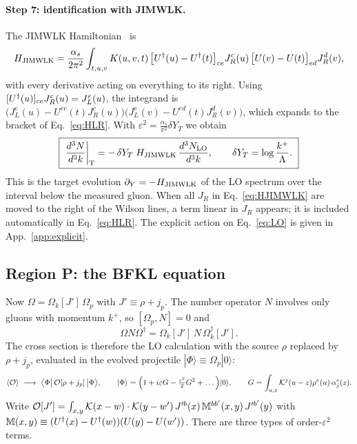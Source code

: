 \paragraph*{Step 7: identification with JIMWLK.} The JIMWLK Hamiltonian~\cite{JalilianMarian:1997jx,JalilianMarian:1997gr,JalilianMarian:1998cb,Kovner:2000pt,Weigert:2000gi,Iancu:2000hn,Ferreiro:2001qy} is
\begin{equation}
H_{\rm JIMWLK}=\frac{\alpha_s}{2\pi^2}\int_{t,u,v}K(u,v,t)\,\big[U^{\dagger}(u)-U^{\dagger}(t)\big]_{ce}J_R^c(u)\,\big[U(v)-U(t)\big]_{ed}J_R^d(v),
\label{eq:HJIMWLK}
\end{equation}
with every derivative acting on everything to its right. Using $[U^{\dagger}(u)]_{ce}J_R^c(u)=J_L^e(u)$, the integrand is $\big(J_L^e(u)-U^{ec}(t)J_R^c(u)\big)\big(J_L^e(v)-U^{ed}(t)J_R^d(v)\big)$, which expands to the bracket of Eq.~\eqref{eq:HLR}. With $\varepsilon^2=\frac{\alpha_s}{\pi^2}\delta Y_T$ we obtain
\begin{equation}
\boxed{\ \frac{d^3N}{d^3k}\bigg|_{\rm T}=-\,\delta Y_T\;H_{\rm JIMWLK}\,\frac{d^3N_{\rm LO}}{d^3k},\qquad \delta Y_T=\log\frac{k^+}{\Lambda}.\ }
\label{eq:Tresult}
\end{equation}
This is the target evolution $\partial_Y=-H_{\rm JIMWLK}$ of the LO spectrum over the interval below the measured gluon. When all $J_R$ in Eq.~\eqref{eq:HJIMWLK} are moved to the right of the Wilson lines, a term linear in $J_R$ appears; it is included automatically in Eq.~\eqref{eq:HLR}. The explicit action on Eq.~\eqref{eq:LO} is given in App.~\ref{app:explicit}.

\subsection{Region P: the BFKL equation}\label{sec:P}

Now $\Omega=\Omega_k[J']\,\Omega_p$ with $J'\equiv\rho+j_p$. The number operator $N$ involves only gluons with momentum $k^+$, so $[\Omega_p,N]=0$ and
\begin{equation}
\Omega N\Omega^\dagger=\Omega_k[J']\,N\,\Omega_k^\dagger[J'].
\end{equation}
The cross section is therefore the LO calculation with the source $\rho$ replaced by $\rho+j_p$, evaluated in the evolved projectile $|\Phi\rangle\equiv\Omega_p|0\rangle$:
\begin{equation}
\langle\Ord\rangle\ \longrightarrow\ \big\langle\Phi\big|\,\Ord[\rho+j_p]\,\big|\Phi\big\rangle,\qquad|\Phi\rangle=\Big(1+i\varepsilon G-\tfrac{\varepsilon^2}{2}G^2+\dots\Big)|0\rangle,\qquad G=\int_{u,z}\KK^j(u-z)\rho^e(u)\,\alpha^e_j(z).
\end{equation}
Write $\mathcal{O}[J']=\int_{x,y}\mathcal{K}(x-w)\cdot\mathcal{K}(y-w')\,J'^b(x)\,\mathbb M^{bb'}(x,y)\,J'^{b'}(y)$ with $\mathbb M(x,y)\equiv(U^{\dagger}(x)-U^{\dagger}(w))(U(y)-U(w'))$. There are three types of order-$\varepsilon^2$ terms.

